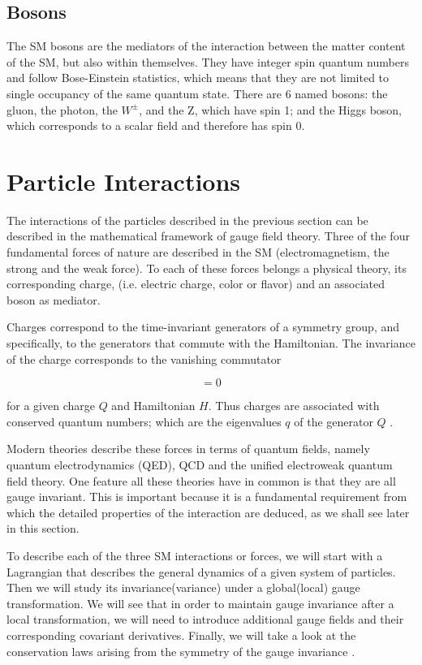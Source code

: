 

\subsection{Bosons}
The SM bosons are the mediators of the interaction between the matter content of the SM, but also within themselves. They have integer spin quantum numbers and follow Bose-Einstein statistics, which means that they are not limited to single occupancy of the same quantum state. There are 6 named bosons: the gluon, the photon, the $W^{\pm}$, and the Z, which have spin 1; and the Higgs boson, which corresponds to a scalar field and therefore has spin 0.

\section{Particle Interactions}
The interactions of the particles described in the previous section can be described in the mathematical framework of gauge field theory. Three of the four fundamental forces of nature are described in the SM (electromagnetism, the strong and the weak force). To each of these forces belongs a physical theory, its corresponding charge, (i.e. electric charge, color or flavor) and an associated boson as mediator. 

Charges correspond to the time-invariant generators of a symmetry group, and specifically, to the generators that commute with the Hamiltonian. The invariance of the charge corresponds to the vanishing commutator

\begin{equation}
[Q, H] = 0
\end{equation}

for a given charge $Q$ and Hamiltonian $H$. Thus charges are associated with conserved quantum numbers; which are the eigenvalues $q$ of the generator $Q$ \cite{wiki:charge}. 

Modern theories describe these forces in terms of quantum fields, namely quantum electrodynamics (QED), QCD and the unified electroweak quantum field theory. One feature all these theories have in common is that they are all gauge invariant. This is important because it is a fundamental requirement from which the detailed properties of the interaction are deduced, as we shall see later in this section.

To describe each of the three SM interactions or forces, we will start with a Lagrangian that describes the general dynamics of a given system of particles. Then we will study its invariance(variance) under a global(local) gauge transformation. We will see that in order to maintain gauge invariance after a local transformation, we will need to introduce additional gauge fields and their corresponding covariant derivatives. Finally, we will take a look at the conservation laws arising from the symmetry of the gauge invariance \cite{Noether1918}.


